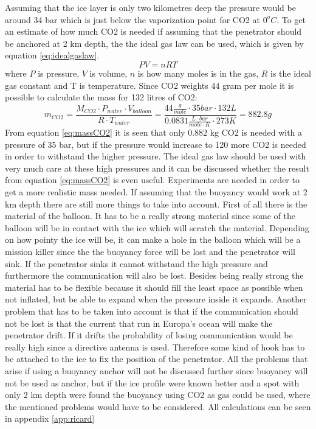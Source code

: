 \noindent
Assuming that the ice layer is only two kilometres deep the pressure would be around 34 bar which is just below the vaporization point for CO2 at $0^oC$. To get an estimate of how much CO2 is needed if assuming that the penetrator should be anchored at 2 km depth, the the ideal gas law can be used, which is given by equation \ref{eq:idealgaslaw}. 
\begin{equation} \label{eq:idealgaslaw}
PV = nRT
\end{equation}
where $P$ is pressure, $V$ is volume, $n$ is how many moles is in the gas, $R$ is the ideal gas constant and T is temperature. Since CO2 weights 44 gram per mole it is possible to calculate the mass for 132 litres of CO2: 
\begin{equation}\label{eq:massCO2}
m_{CO2} = \frac{M_{CO2} \cdot P_{water}\cdot V_{balloon}}{R\cdot T_{water}} = \frac{44 \frac{g}{mole} \cdot 35 bar \cdot 132 L}{0.0831  \frac{L\cdot bar}{mole \cdot K} \cdot 273K} = 882.8 g
\end{equation}
From equation \ref{eq:massCO2} it is seen that only 0.882 kg CO2 is needed with a pressure of 35 bar, but if the pressure would increase to 120 more CO2 is needed in order to withstand the higher pressure. The ideal gas law should be used with very much care at these high pressures and it can be discussed whether the result from equation \ref{eq:massCO2} is even useful. Experiments are needed in order to get a more realistic mass needed. If assuming that the buoyancy would work at 2 km depth there are still more things to take into account. First of all there is the material of the balloon. It has to be a really strong material since some of the balloon will be in contact with the ice which will scratch the material. Depending on how pointy the ice will be, it can make a hole in the balloon which will be a mission killer since the the buoyancy force will be lost and the penetrator will sink. If the penetrator sinks it cannot withstand the high pressure and furthermore the communication will also be lost. Besides being really strong the material has to be flexible because it should fill the least space as possible when not inflated, but be able to expand when the pressure inside it expands. Another problem that has to be taken into account is that if the communication should not be lost is that the current that run in Europa's ocean will make the penetrator drift. If it drifts the probability of losing communication would be really high since a directive antenna is used.  Therefore some kind of hook has to be attached to the ice to fix the position of the penetrator. All the problems that arise if using a buoyancy anchor will not be discussed further since buoyancy will not be used as anchor, but if the ice profile were known better and a spot with only 2 km depth were found the buoyancy using CO2 as gas could be used, where the mentioned problems would have to be considered. All calculations can be seen in appendix \ref{app:ricard}\\

